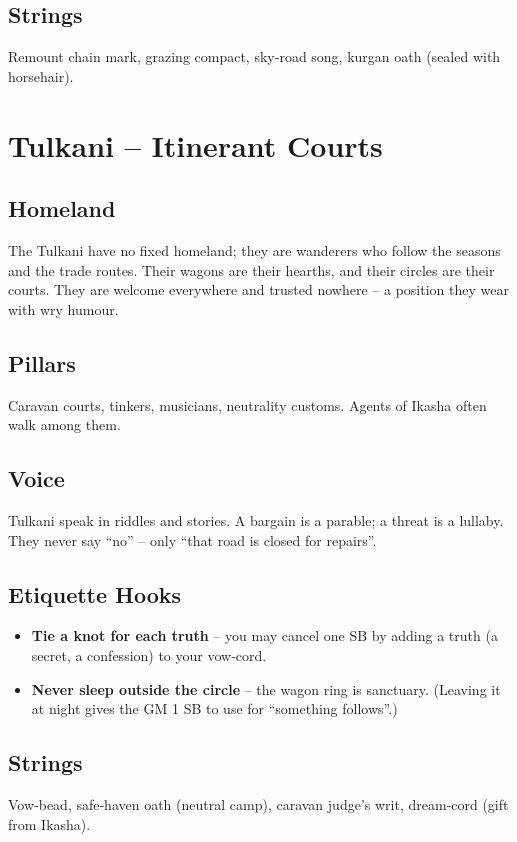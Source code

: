 \documentclass[11pt]{book}
\begin{document}
\subsection*{Strings}
Remount chain mark, grazing compact, sky‑road song, kurgan oath (sealed with horsehair).

\section{Tulkani -- Itinerant Courts}
\subsection*{Homeland}
The Tulkani have no fixed homeland; they are wanderers who follow the seasons and the trade routes. Their wagons are their hearths, and their circles are their courts. They are welcome everywhere and trusted nowhere -- a position they wear with wry humour.

\subsection*{Pillars}
Caravan courts, tinkers, musicians, neutrality customs. Agents of Ikasha often walk among them.

\subsection*{Voice}
Tulkani speak in riddles and stories. A bargain is a parable; a threat is a lullaby. They never say “no” -- only “that road is closed for repairs”.

\subsection*{Etiquette Hooks}
\begin{itemize}
    \item \textbf{Tie a knot for each truth} -- you may cancel one SB by adding a truth (a secret, a confession) to your vow‑cord.
    \item \textbf{Never sleep outside the circle} -- the wagon ring is sanctuary. (Leaving it at night gives the GM 1 SB to use for “something follows”.)
\end{itemize}

\subsection*{Strings}
Vow‑bead, safe‑haven oath (neutral camp), caravan judge’s writ, dream‑cord (gift from Ikasha).
\end{document}

